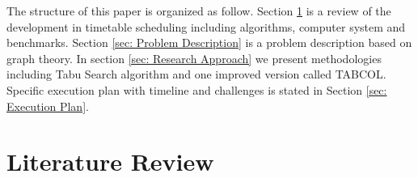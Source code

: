 \documentclass{article}
\begin{document}
The structure of this paper is organized as follow. Section \ref{sec: Literature Review} is a review of the development in timetable scheduling including algorithms, computer system and benchmarks. Section \ref{sec: Problem Description} is a problem description based on graph theory. In section \ref{sec: Research Approach} we present methodologies including Tabu Search algorithm and one improved version called TABCOL. Specific execution plan with timeline and challenges is stated in Section \ref{sec: Execution Plan}.

\newpage

\section{Literature Review}
\label{sec: Literature Review}
\end{document}

